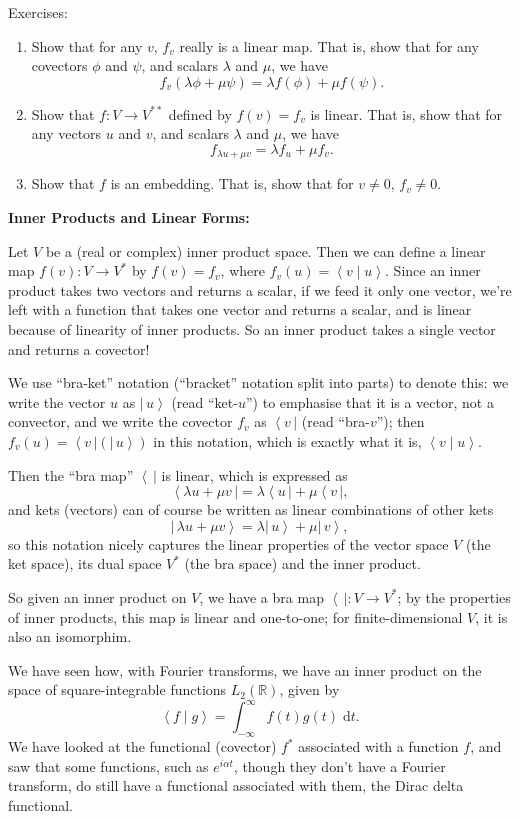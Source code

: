 \documentclass{article}
\newcommand{\diff}{\;\mathrm{d}}
\newcommand{\bra}[1]{\left\langle #1 \,\right|}
\newcommand{\ket}[1]{\left|\, #1\right\rangle}
\newcommand{\braket}[2]{\left\langle #1 \mid #2 \right\rangle}
\begin{document}
Exercises:

\begin{enumerate}
	\item Show that for any $v$, $f_v$ really is a linear map. That is, show that for any covectors $\phi$ and $\psi$, and scalars $\lambda$ and $\mu$, we have
		\[f_v(\lambda\phi+\mu\psi)=\lambda f(\phi) +\mu f(\psi).\]
	\item Show that $f:V\to V^{**}$ defined by $f(v)=f_v$ is linear. That is, show that for any vectors $u$ and $v$, and scalars $\lambda$ and $\mu$, we have
		\[f_{\lambda u+\mu v}=\lambda f_u + \mu f_v.\]
	\item Show that $f$ is an embedding. That is, show that for $v\neq 0$, $f_v\neq 0$.
\end{enumerate}


\bigskip


\textbf{Inner Products and Linear Forms:}\bigskip

Let $V$ be a (real or complex) inner product space. Then we can define a linear map $f(v):V\to V^*$ by $f(v)=f_v$, where $f_v(u)=\braket{v}{u}$. Since an inner product takes two vectors and returns a scalar, if we feed it only one vector, we're left with a function that takes one vector and returns a scalar, and is linear because of linearity of inner products. So an inner product takes a single vector and returns a covector!

We use ``bra-ket'' notation (``bracket'' notation split into parts) to denote this: we write the vector $u$ as $\ket{u}$ (read ``ket-$u$'') to emphasise that it is a vector, not a convector, and we write the covector $f_v$ as $\bra{v}$ (read ``bra-$v$''); then $f_v(u)=\bra{v}(\ket{u})$ in this notation, which is exactly what it is, $\braket{v}{u}$.

Then the ``bra map'' $\bra{}$ is linear, which is expressed as
\[\bra{\lambda u +\mu v}=\lambda \bra{u}+\mu \bra{v},\]
and kets (vectors) can of course be written as linear combinations of other kets
\[\ket{\lambda u + \mu v}=\lambda \ket{u}+\mu \ket{v},\]
so this notation nicely captures the linear properties of the vector space $V$ (the ket space), its dual space $V^*$ (the bra space) and the inner product.

So given an inner product on $V$, we have a bra map $\bra{}:V\to V^*$; by the properties of inner products, this map is linear and one-to-one; for finite-dimensional $V$, it is also an isomorphim.

We have seen how, with Fourier transforms, we have an inner product on the space of square-integrable functions $L_2(\mathbb{R})$, given by
\[\braket{f}{g}=\int_{-\infty}^\infty f(t)g(t)\diff t.\]
We have looked at the functional (covector) $f^*$ associated with a function $f$, and saw that some functions, such as $e^{i\alpha t}$, though they don't have a Fourier transform, do still have a functional associated with them, the Dirac delta functional.
\end{document}
